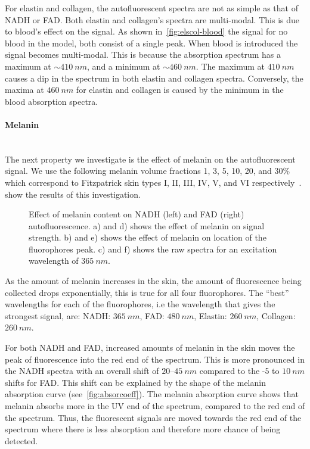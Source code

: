 For elastin and collagen, the autofluorescent spectra are not as simple as that of NADH or FAD\@.
Both elastin and collagen's spectra are multi-modal.
This is due to blood's effect on the signal.
As shown in~\cref{fig:elscol-blood} the signal for no blood in the model, both consist of a single peak.
When blood is introduced the signal becomes multi-modal.
This is because the absorption spectrum has a maximum at $\sim410~nm$, and a minimum at $\sim460~nm$.
The maximum at $410~nm$ causes a dip in the spectrum in both elastin and collagen spectra.
Conversely, the maxima at $460~nm$ for elastin and collagen is caused by the minimum in the blood absorption spectra.


\paragraph*{Melanin}\hspace{0pt}\\
The next property we investigate is the effect of melanin on the autofluorescent signal.
We use the following melanin volume fractions 1, 3, 5, 10, 20, and $30\%$ which correspond to Fitzpatrick skin types I, II, III, IV, V, and VI respectively~\cite{iglesias2015biophysically,fitzpatrick1988validity}.
 show the results of this investigation.

\begin{figure}[!htbp]
    \centering
    \caption{Effect of melanin content on NADH (left) and FAD (right) autofluorescence. a) and d) shows the effect of melanin on signal strength. b) and e) shows the effect of melanin on location of the fluorophores peak. c) and f) shows the raw spectra for an excitation wavelength of $365~nm$.}%
    \label{fig:nadhfad-mel}%
\end{figure}

As the amount of melanin increases in the skin, the amount of fluorescence being collected drops exponentially, this is true for all four fluorophores.
The ``best'' wavelengths for each of the fluorophores, i.e the wavelength that gives the strongest signal, are: NADH: $365~nm$, FAD: $480~nm$, Elastin: $260~nm$, Collagen: $260~nm$.

For both NADH and FAD, increased amounts of melanin in the skin moves the peak of fluorescence into the red end of the spectrum.
This is more pronounced in the NADH spectra with an overall shift of $20$--$45~nm$ compared to the -5 to $10~nm$ shifts for FAD\@.
This shift can be explained by the shape of the melanin absorption curve (see~\cref{fig:absorcoeff}).
The melanin absorption curve shows that melanin absorbs more in the UV end of the spectrum, compared to the red end of the spectrum.
Thus, the fluorescent signals are moved towards the red end of the spectrum where there is less absorption and therefore more chance of being detected.

